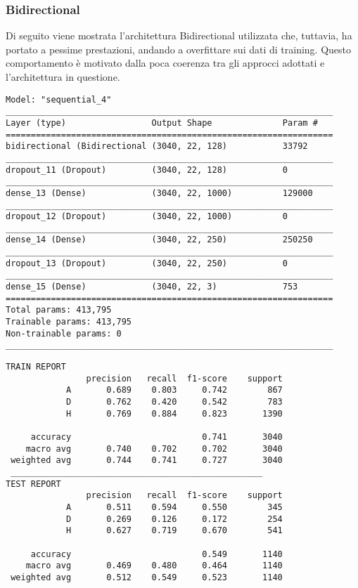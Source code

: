 \subsubsection*{Bidirectional}
Di seguito viene mostrata l'architettura Bidirectional utilizzata che, tuttavia, ha portato a pessime prestazioni, andando a overfittare sui dati di training. Questo comportamento è motivato dalla poca coerenza tra gli approcci adottati e l'architettura in questione.
\begin{lstlisting}[style=arch]
Model: "sequential_4"
_________________________________________________________________
Layer (type)                 Output Shape              Param #   
=================================================================
bidirectional (Bidirectional (3040, 22, 128)           33792     
_________________________________________________________________
dropout_11 (Dropout)         (3040, 22, 128)           0         
_________________________________________________________________
dense_13 (Dense)             (3040, 22, 1000)          129000    
_________________________________________________________________
dropout_12 (Dropout)         (3040, 22, 1000)          0         
_________________________________________________________________
dense_14 (Dense)             (3040, 22, 250)           250250    
_________________________________________________________________
dropout_13 (Dropout)         (3040, 22, 250)           0         
_________________________________________________________________
dense_15 (Dense)             (3040, 22, 3)             753       
=================================================================
Total params: 413,795
Trainable params: 413,795
Non-trainable params: 0
_________________________________________________________________

\end{lstlisting}

\begin{lstlisting}[style=report]
TRAIN REPORT
                precision   recall  f1-score    support
            A       0.689    0.803     0.742        867
            D       0.762    0.420     0.542        783
            H       0.769    0.884     0.823       1390

     accuracy                          0.741       3040
    macro avg       0.740    0.702     0.702       3040
 weighted avg       0.744    0.741     0.727       3040
 __________________________________________________
TEST REPORT
                precision   recall  f1-score    support
            A       0.511    0.594     0.550        345
            D       0.269    0.126     0.172        254
            H       0.627    0.719     0.670        541

     accuracy                          0.549       1140
    macro avg       0.469    0.480     0.464       1140
 weighted avg       0.512    0.549     0.523       1140
\end{lstlisting}


